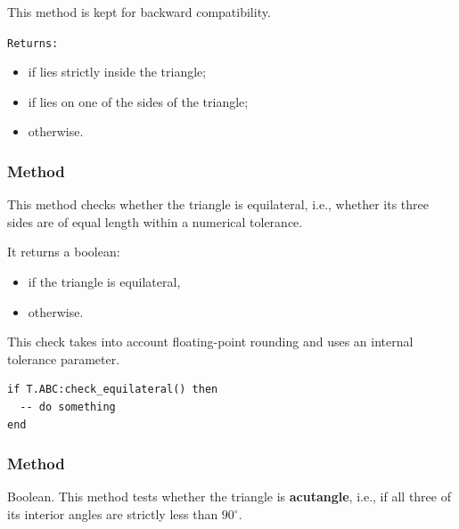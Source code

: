 This method is kept for backward compatibility.


\medskip

\texttt{Returns: }
\begin{itemize}
  \item {} if  lies strictly inside the triangle;
  \item {} if  lies on one of the sides of the triangle;
  \item {} otherwise.
\end{itemize}




\subsubsection{Method }
\label{ssub:_triangle_check__equilateral}

This method checks whether the triangle is equilateral, i.e., whether its three sides are of equal length within a numerical tolerance.

\medskip

It returns a boolean:
\begin{itemize}
  \item {} if the triangle is equilateral,
  \item {} otherwise.
\end{itemize}


This check takes into account floating-point rounding and uses an internal tolerance parameter.


\begin{mybox}
\begin{verbatim}
if T.ABC:check_equilateral() then
  -- do something
end
\end{verbatim}
\end{mybox}

\vspace{1em}

\subsubsection{Method }
\label{ssub:_triangle_check__acutangle}

Boolean. This method tests whether the triangle is \textbf{acutangle}, i.e., if all three of its interior angles are strictly less than $90^\circ$.

\medskip

